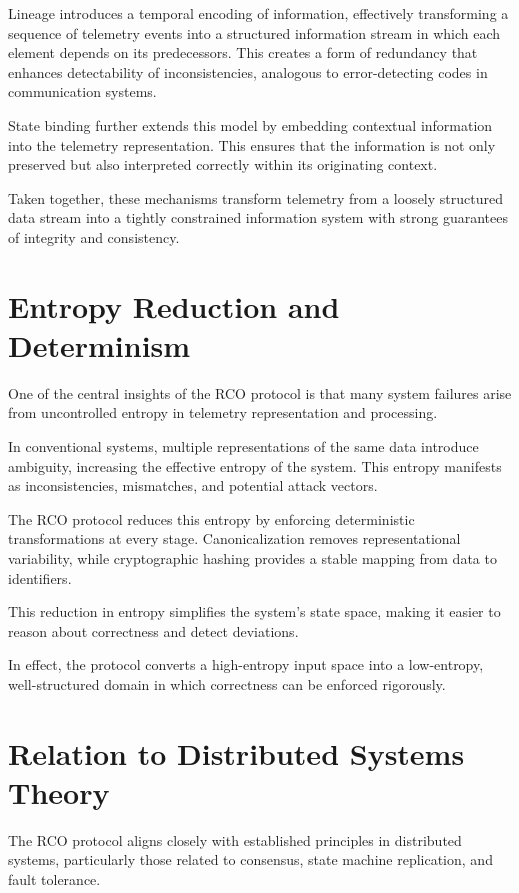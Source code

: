 Lineage introduces a temporal encoding of information, effectively transforming a sequence of telemetry events into a structured information stream in which each element depends on its predecessors. This creates a form of redundancy that enhances detectability of inconsistencies, analogous to error-detecting codes in communication systems.

State binding further extends this model by embedding contextual information into the telemetry representation. This ensures that the information is not only preserved but also interpreted correctly within its originating context.

Taken together, these mechanisms transform telemetry from a loosely structured data stream into a tightly constrained information system with strong guarantees of integrity and consistency.

\section{Entropy Reduction and Determinism}

One of the central insights of the RCO protocol is that many system failures arise from uncontrolled entropy in telemetry representation and processing.

In conventional systems, multiple representations of the same data introduce ambiguity, increasing the effective entropy of the system. This entropy manifests as inconsistencies, mismatches, and potential attack vectors.

The RCO protocol reduces this entropy by enforcing deterministic transformations at every stage. Canonicalization removes representational variability, while cryptographic hashing provides a stable mapping from data to identifiers.

This reduction in entropy simplifies the system’s state space, making it easier to reason about correctness and detect deviations.

In effect, the protocol converts a high-entropy input space into a low-entropy, well-structured domain in which correctness can be enforced rigorously.

\section{Relation to Distributed Systems Theory}

The RCO protocol aligns closely with established principles in distributed systems, particularly those related to consensus, state machine replication, and fault tolerance.

